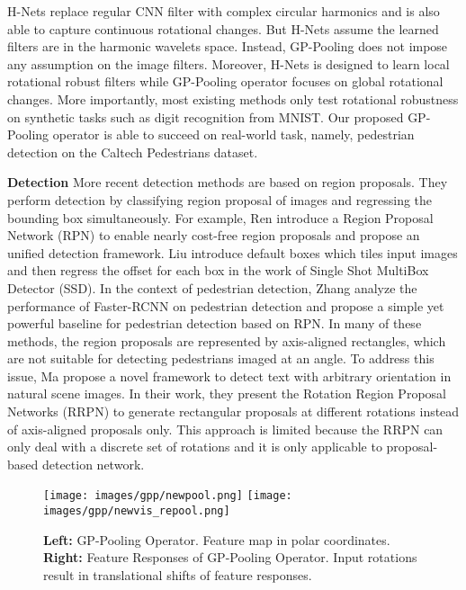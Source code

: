 \documentclass[10pt,twocolumn,letterpaper]{article}
\begin{document}
H-Nets \cite{Worrall} replace regular CNN filter with complex circular harmonics and is also able to capture continuous rotational changes. But H-Nets assume the learned filters are in the harmonic wavelets space. Instead, GP-Pooling does not impose any assumption on the image filters. Moreover, H-Nets is designed to learn local rotational robust filters while GP-Pooling operator focuses on global rotational changes. More importantly, most existing methods only test rotational robustness on synthetic tasks such as digit recognition from MNIST. Our proposed GP-Pooling operator is able to succeed on real-world task, namely, pedestrian detection on the Caltech Pedestrians dataset.

\noindent\textbf{Detection} More recent detection methods are based on region proposals. They perform detection by classifying region proposal of images and regressing the bounding box simultaneously. For example, Ren \etal \cite{Ren2015} introduce a Region Proposal Network (RPN) to enable nearly cost-free region proposals and propose an unified detection framework. Liu \etal \cite{Liu2015} introduce default boxes which tiles input images and then regress the offset for each box in the work of Single Shot MultiBox Detector (SSD). In the context of pedestrian detection, Zhang \etal \cite{Zhang2016} analyze the performance of Faster-RCNN on pedestrian detection and propose a simple yet powerful baseline for pedestrian detection based on RPN. In many of these methods, the region proposals are represented by axis-aligned rectangles, which are not suitable for detecting pedestrians imaged at an angle. To address this issue, Ma \etal \cite{Ma2017} propose a novel framework to detect text with arbitrary orientation in natural scene images. In their work, they present the Rotation Region Proposal Networks (RRPN) to generate rectangular proposals at different rotations instead of axis-aligned proposals only. This approach is limited because the RRPN can only deal with a discrete set of rotations and it is only applicable to proposal-based detection network.


\begin{figure}[tb]
    \centering
    \texttt{[image: images/gpp/newpool.png]}
    \texttt{[image: images/gpp/newvis\_repool.png]}

    \caption{\textbf{Left:} GP-Pooling Operator. Feature map in polar coordinates. \textbf{Right:} Feature Responses of GP-Pooling Operator. Input rotations result in translational shifts of feature responses.}
    \label{fig:RE-Pooling}
    \vspace{-0.3cm}
\end{figure}
\end{document}
